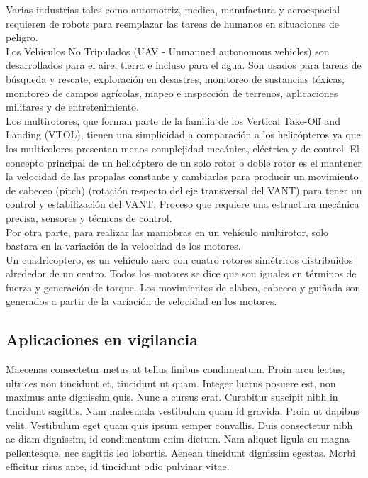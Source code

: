 \documentclass{article}
\begin{document}
Varias industrias tales como automotriz, medica, manufactura y aeroespacial requieren de robots para reemplazar las tareas de humanos en situaciones de peligro.\\

Los Vehiculos No Tripulados (UAV - Unmanned autonomous vehicles) son desarrollados para el aire, tierra e incluso para el agua. Son usados para tareas de búsqueda y rescate, exploración en desastres, monitoreo de sustancias tóxicas, monitoreo de campos agrícolas, mapeo e inspección de terrenos, aplicaciones militares y de entretenimiento.\\

Los multirotores, que forman parte de la familia de los Vertical Take-Off and Landing (VTOL), tienen una simplicidad a comparación a los helicópteros ya que los multicolores presentan menos complejidad mecánica, eléctrica y de control. El concepto principal de un helicóptero de un solo rotor o doble rotor es el mantener la velocidad de las propalas constante y cambiarlas para producir un movimiento de cabeceo (pitch) (rotación respecto del eje transversal del VANT) para tener un control y estabilización del VANT. Proceso que requiere una estructura mecánica precisa, sensores y técnicas de control.\\

Por otra parte, para realizar las maniobras en un vehículo multirotor, solo bastara en la variación de la velocidad de los motores.\\

Un cuadricoptero, es un vehículo aero con cuatro rotores simétricos distribuidos alrededor de un centro. Todos los motores se dice que son iguales en términos de fuerza y generación de torque. Los movimientos de alabeo, cabeceo y guiñada son generados a partir de la variación de velocidad en los motores.\\


\subsection{Aplicaciones en vigilancia}

Maecenas consectetur metus at tellus finibus condimentum. Proin arcu lectus, ultrices non tincidunt et, tincidunt ut quam. Integer luctus posuere est, non maximus ante dignissim quis. Nunc a cursus erat. Curabitur suscipit nibh in tincidunt sagittis. Nam malesuada vestibulum quam id gravida. Proin ut dapibus velit. Vestibulum eget quam quis ipsum semper convallis. Duis consectetur nibh ac diam dignissim, id condimentum enim dictum. Nam aliquet ligula eu magna pellentesque, nec sagittis leo lobortis. Aenean tincidunt dignissim egestas. Morbi efficitur risus ante, id tincidunt odio pulvinar vitae.
\end{document}
